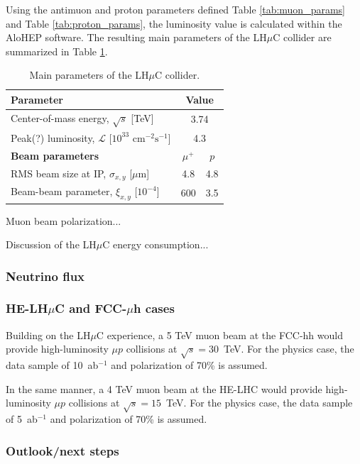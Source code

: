 \documentclass[a4paper,11pt]{article}
\newcommand{\lhuc}{LH\ensuremath{\mu}C\xspace}
\begin{document}
Using the antimuon and proton parameters defined Table  \ref{tab:muon_params} and Table  \ref{tab:proton_params}, the luminosity value is calculated within the AloHEP software. The resulting main parameters of the LH$\mu$C collider are summarized in Table \ref{tab:final_performance}.

\begin{table}[htbp]
\centering
\caption{Main parameters of the LH$\mu$C collider.}
\label{tab:final_performance}
\begin{tabular}{lcc}
\hline
\textbf{Parameter} & \multicolumn{2}{c}{\textbf{Value}} \\
\hline
Center-of-mass energy, $\sqrt{s}$ [TeV] & \multicolumn{2}{c}{3.74} \\
Peak(?) luminosity, $\mathcal{L}$ [$10^{33} \text{ cm}^{-2}\text{s}^{-1}$] & \multicolumn{2}{c}{4.3} \\
\hline
\textbf{Beam parameters} & $\mu^+$ & $p$ \\
\hline
RMS beam size at IP, $\sigma_{x,y}$ [$\mu$m] & 4.8 & 4.8 \\
Beam-beam parameter, $\xi_{x,y}$ [$10^{-4}$] & 600 & 3.5 \\
\hline
\end{tabular}
\end{table}

Muon beam polarization...

Discussion of the \lhuc energy consumption...

\subsubsection{Neutrino flux}

\subsubsection{HE-LH$\mu$C and FCC-$\mu$h cases}

Building on the \lhuc experience,
a 5 TeV muon beam at the FCC-hh would provide high-luminosity $\mu p$ collisions at $\sqrt{s}=30$~TeV.
For the physics case, the data sample of 10~ab$^{-1}$ and polarization of 70\% is assumed.

In the same manner, a 4 TeV muon beam at the HE-LHC would provide high-luminosity $\mu p$ collisions at $\sqrt{s}=15$~TeV.
For the physics case, the data sample of 5~ab$^{-1}$ and polarization of 70\% is assumed.

\subsubsection{Outlook/next steps}
\end{document}
